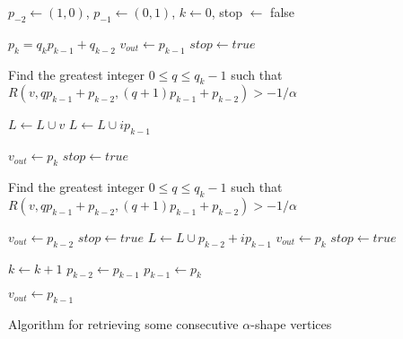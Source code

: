 \documentclass{article}
\begin{document}
\begin{algorithm}[h]
  $p_{-2} \leftarrow (1,0)$, $p_{-1} \leftarrow (0,1)$, $k \leftarrow 0$, stop $\leftarrow$ false \;
  {
    $p_k = q_k p_{k-1} + q_{k-2}$ \;
    {
      {
        $v_{out} \leftarrow p_{k-1}$ \;
        $stop\leftarrow true$ \;
      }
    }
    {
      {
        {
          Find the greatest integer $0 \leq q \leq q_{k} - 1$ such that 
          $R(v, qp_{k-1} + p_{k-2}, (q+1)p_{k-1} + p_{k-2}) > -1/\alpha$ \;
          
          $L \leftarrow L \cup v$ \; 
          {
            $L \leftarrow L \cup i p_{k-1} $ \;      
          }
        }
        $v_{out} \leftarrow p_{k}$ \;
        $stop \leftarrow true$ \;
      }  
      {
        {
          Find the greatest integer $0 \leq q \leq q_{k} - 1$ such that 
          $R(v, qp_{k-1} + p_{k-2}, (q+1)p_{k-1} + p_{k-2}) > -1/\alpha$ \;
        
          {
            $v_{out} \leftarrow p_{k-2}$ \;
            $stop \leftarrow true$ \;
          }
          {
            {
              $L \leftarrow L \cup p_{k-2} + i p_{k-1} $ \;      
            }
            $v_{out} \leftarrow p_{k}$ \;
            $stop \leftarrow true$ \;
          }  
        }
      } 
    }
    $k \leftarrow k + 1$ \;
    $p_{k-2} \leftarrow p_{k-1}$ \;
    $p_{k-1} \leftarrow p_{k}$ \;
   }
   {
    $v_{out} \leftarrow p_{k-1}$ \; 
   } 

  \caption{Algorithm for retrieving some consecutive $\alpha$-shape vertices}
  \label{algo:1}

\end{algorithm}
\end{document}
